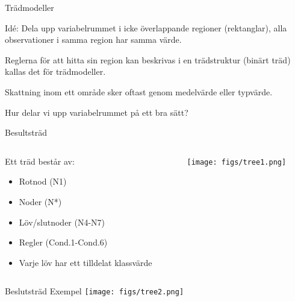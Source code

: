 \documentclass[10pt,english]{beamer}
\begin{document}
\begin{frame}{Trädmodeller}
    \begin{greenbox}
        Idé: Dela upp variabelrummet i icke överlappande regioner (rektanglar), alla observationer i samma region har samma värde.
    \end{greenbox}

    Reglerna för att hitta sin region kan beskrivas i en trädstruktur (binärt träd) kallas det för trädmodeller.

    Skattning inom ett område sker oftast genom medelvärde eller typvärde.

    Hur delar vi upp variabelrummet på ett bra sätt?
\end{frame}

\begin{frame}{Besultsträd}
    \begin{columns}
        \begin{column}{0.5\textwidth}
           Ett träd består av:
           \begin{itemize}
            \item Rotnod (N1)
            \item Noder (N*)
            \item Löv/slutnoder (N4-N7)
            \item Regler (Cond.1-Cond.6)
            \item Varje löv har ett tilldelat klassvärde
           \end{itemize}
        \end{column}
        \begin{column}{0.5\textwidth}  %
            \begin{center}
             \texttt{[image: figs/tree1.png]}
             \end{center}
        \end{column}
        \end{columns}
\end{frame}

\begin{frame}{Beslutsträd Exempel}
    \texttt{[image: figs/tree2.png]}
\end{frame}
\end{document}
